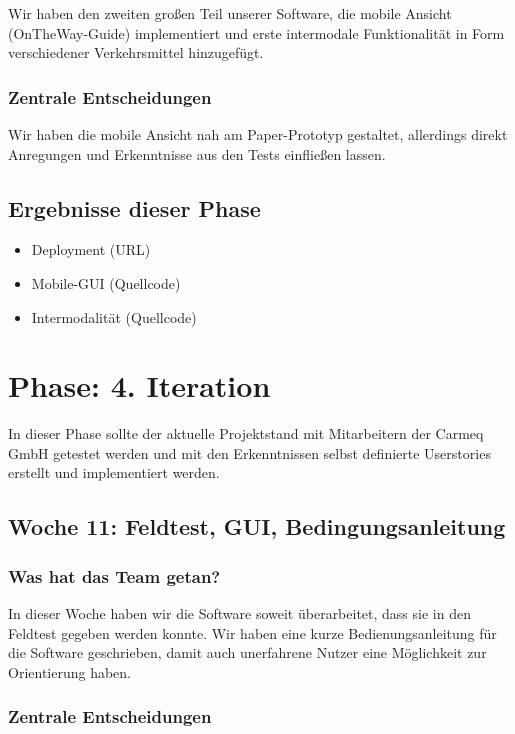 \documentclass{article}
\begin{document}
Wir haben den zweiten gro\ss en Teil unserer Software, die mobile Ansicht (OnTheWay-Guide) implementiert und erste intermodale Funktionalit\"at in Form verschiedener Verkehrsmittel hinzugef\"ugt.

\subsubsection{Zentrale Entscheidungen}

Wir haben die mobile Ansicht nah am Paper-Prototyp gestaltet, allerdings direkt Anregungen und Erkenntnisse aus den Tests einflie\ss en lassen.

\subsection{Ergebnisse dieser Phase}

\begin{itemize}
\item Deployment (URL)
\item Mobile-GUI (Quellcode)
\item Intermodalit\"at (Quellcode)
\end{itemize}

\section{Phase: 4. Iteration}

In dieser Phase sollte der aktuelle Projektstand mit Mitarbeitern der Carmeq GmbH getestet werden und mit den Erkenntnissen selbst definierte Userstories erstellt und implementiert werden.

\subsection{Woche 11: Feldtest, GUI, Bedingungsanleitung}

\subsubsection{Was hat das Team getan?}

In dieser Woche haben wir die Software soweit \"uberarbeitet, dass sie in den Feldtest gegeben werden konnte. Wir haben eine kurze Bedienungsanleitung f\"ur die Software geschrieben, damit auch unerfahrene Nutzer eine M\"oglichkeit zur Orientierung haben.

\subsubsection{Zentrale Entscheidungen}
\end{document}
